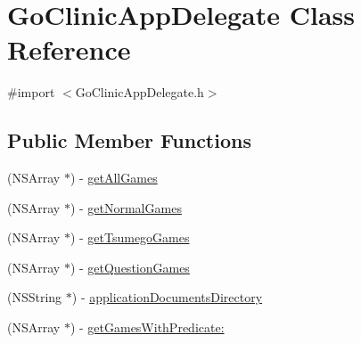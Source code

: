 \hypertarget{interface_go_clinic_app_delegate}{
\section{GoClinicAppDelegate Class Reference}
\label{interface_go_clinic_app_delegate}
}


{\ttfamily \#import $<$GoClinicAppDelegate.h$>$}

\subsection*{Public Member Functions}
\begin{DoxyCompactItemize}
\item 
(NSArray $\ast$) -\/ \hyperlink{interface_go_clinic_app_delegate_a21129e1491b4c7ef7eb9c1c7b5886698}{getAllGames}
\item 
(NSArray $\ast$) -\/ \hyperlink{interface_go_clinic_app_delegate_a5c34c97840fa37539b669ca41093622b}{getNormalGames}
\item 
(NSArray $\ast$) -\/ \hyperlink{interface_go_clinic_app_delegate_a85cd07d46b0f198b149181474e996e91}{getTsumegoGames}
\item 
(NSArray $\ast$) -\/ \hyperlink{interface_go_clinic_app_delegate_a65aa362611da5b0e2493fe686eac1de9}{getQuestionGames}
\item 
(NSString $\ast$) -\/ \hyperlink{interface_go_clinic_app_delegate_a087ecbf65e4aca2a528d81054640df81}{applicationDocumentsDirectory}
\item 
(NSArray $\ast$) -\/ \hyperlink{interface_go_clinic_app_delegate_a63108c99e4d0a18f7836468bf9708632}{getGamesWithPredicate:}
\end{DoxyCompactItemize}
